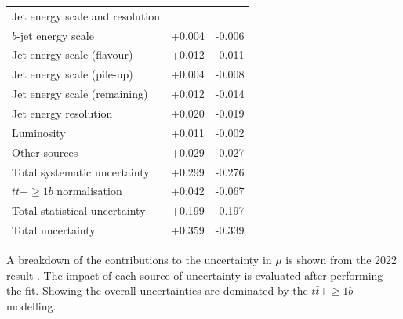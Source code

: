 \begin{center}
\begin{tabular}{l S S}
Jet energy scale and resolution & & \\
\hspace{1em} $b$-jet energy scale         & +0.004 & -0.006 \\
\hspace{1em} Jet energy scale (flavour)   & +0.012 & -0.011 \\
\hspace{1em} Jet energy scale (pile-up)    & +0.004 & -0.008 \\
\hspace{1em} Jet energy scale (remaining) & +0.012 & -0.014 \\
\hspace{1em} Jet energy resolution        & +0.020 & -0.019 \\
Luminosity    & +0.011 & -0.002 \\
Other sources & +0.029 & -0.027 \\
\midrule
Total systematic uncertainty & +0.299 & -0.276 \\
\midrule
\midrule
$t\bar{t} + \geq 1b$  normalisation & +0.042 & -0.067 \\
\midrule
Total statistical uncertainty & +0.199  & -0.197 \\
\midrule
\midrule
Total uncertainty & +0.359 & -0.339\\
\midrule
\bottomrule
\end{tabular}
\end{center}
\caption{A breakdown of the contributions to the uncertainty in $\mu$ is shown from the 2022 result \cite{tth-atlas-2018}. The impact of each source of uncertainty is evaluated after performing the fit. Showing the overall uncertainties are dominated by the $t\bar{t} + \geq 1b$ modelling. 
}
\label{tab:results:syst}

 
